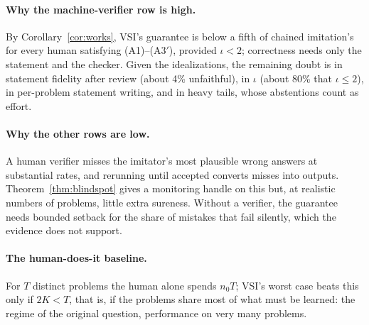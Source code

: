 \documentclass[11pt]{article}
\theoremstyle{definition}
\theoremstyle{remark}
\newcommand{\K}{K}
\begin{document}
\begin{table}[h]
\caption{Our subjective probability that each scheme works, conditional on the idealizations. $^\dagger$informal theory / software without a full specification. $^\S$A stronger criterion than ``works''; 55\% for formalization-style work, 31\% for new research \cite{threadY}. The formal rows follow the calibration thread \cite{threadT}; without the idealizations the 70\% row falls to about 40\% \cite{threadS,threadT} (45\% with the unrefereed stochastic variants of Section~\ref{sec:practice}). The human-verifier rows follow the second red team \cite{threadS}, lowered by the evidence that most failed runs end with a confident claimed solution \cite{threadW}; VSI-R's design (a randomized pool, a second judge for located objections, cached verdicts) adds a few points in theory, within the noise of the estimates \cite{redteam3}. All figures are judgments, built largely on estimates that no referee has checked against data. That VSI's task queries are truly $O(\K)$, with neither $n_0$ nor $1/\varepsilon$, we put at about 25\%.}
\label{tab:sure}
\end{table}

\paragraph{Why the machine-verifier row is high.} By Corollary~\ref{cor:works}, VSI's guarantee is below a fifth of chained imitation's for every human satisfying (A1)--(A3$'$), provided $\iota<2$; correctness needs only the statement and the checker. Given the idealizations, the remaining doubt is in statement fidelity after review (about 4\% unfaithful), in $\iota$ (about 80\% that $\iota\le2$), in per-problem statement writing, and in heavy tails, whose abstentions count as effort.

\paragraph{Why the other rows are low.} A human verifier misses the imitator's most plausible wrong answers at substantial rates, and rerunning until accepted converts misses into outputs. Theorem~\ref{thm:blindspot} gives a monitoring handle on this but, at realistic numbers of problems, little extra sureness. Without a verifier, the guarantee needs bounded setback for the share of mistakes that fail silently, which the evidence does not support.

\paragraph{The human-does-it baseline.} For $T$ distinct problems the human alone spends $n_0T$; VSI's worst case beats this only if $2\K<T$, that is, if the problems share most of what must be learned: the regime of the original question, performance on very many problems.
\end{document}
